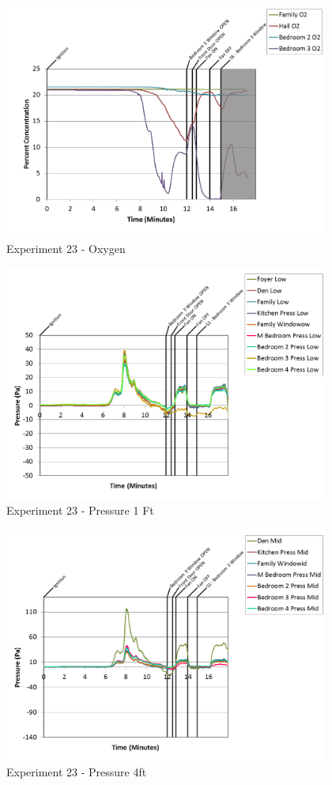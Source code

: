 \documentclass{article}
\begin{document}
\begin{appendices}
\begin{figure}[h!]
	\centering
	\includegraphics[height=3.05in]{0_Images/Results_Charts/Exp_23_Charts/Oxygen.png}
	\caption{Experiment 23 - Oxygen}
\end{figure}

\clearpage

\begin{figure}[h!]
	\centering
	\includegraphics[height=3.05in]{0_Images/Results_Charts/Exp_23_Charts/Pressure1Ft.png}
	\caption{Experiment 23 - Pressure 1 Ft}
\end{figure}


\begin{figure}[h!]
	\centering
	\includegraphics[height=3.05in]{0_Images/Results_Charts/Exp_23_Charts/Pressure4ft.png}
	\caption{Experiment 23 - Pressure 4ft}
\end{figure}


\end{appendices}
\end{document}
